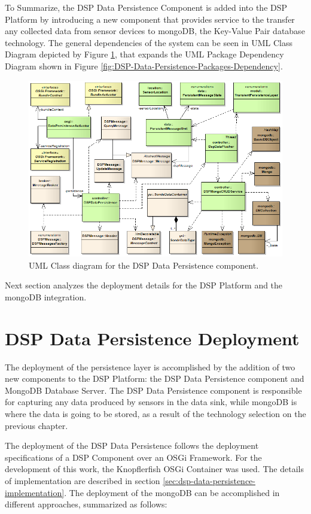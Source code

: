 To Summarize, the DSP Data Persistence Component is added into the DSP Platform
by introducing a new component that provides service to the transfer any
collected data from sensor devices to mongoDB, the Key-Value Pair database
technology. The general dependencies of the system can be seen in UML
Class Diagram depicted by Figure \ref{fig:DSP-Data-Persistence-Classes}, that
expands the UML Package Dependency Diagram shown in Figure
\ref{fig:DSP-Data-Persistence-Packages-Dependency}.

\begin{figure}[!t]
  \centering
  \includegraphics[scale=0.65]{../diagrams/DSP-Data-Persistence-Classes}
  \caption{UML Class diagram for the DSP Data Persistence component.}
  \label{fig:DSP-Data-Persistence-Classes}
\end{figure}

Next section analyzes the deployment details for the DSP Platform and the
mongoDB integration.

\section{DSP Data Persistence Deployment}

The deployment of the persistence layer is accomplished by the addition of two
new components to the DSP Platform: the DSP Data Persistence component and MongoDB
Database Server. The DSP Data Persistence component is responsible for capturing 
any data produced by sensors in the data sink, while mongoDB is where the data is 
going to be stored, as a result of the technology selection on the previous chapter. 

The deployment of the DSP Data Persistence follows the deployment specifications
of a DSP Component over an OSGi Framework. For the development of this work,
the Knopflerfish OSGi Container was used. The details of implementation are described
in section \ref{sec:dsp-data-persistence-implementation}. The deployment of the 
mongoDB can be accomplished in different approaches, summarized as follows: 

